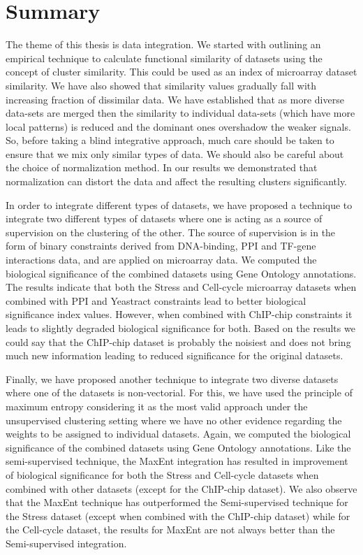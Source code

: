 \section{Summary}
The theme of this thesis is data integration. We started with outlining an empirical technique to calculate functional similarity of datasets using the concept of cluster similarity. This could be used as an index of microarray dataset similarity. We have also showed that similarity values gradually fall with increasing fraction of dissimilar data. We have established that as more diverse data-sets are merged then the similarity to individual data-sets (which have more local patterns) is reduced and the dominant ones overshadow the weaker signals. So, before taking a blind integrative approach, much care should be taken to ensure that we mix only similar types of data. We should also be careful about the choice of normalization method. In our results we demonstrated that normalization can distort the data and affect the resulting clusters significantly.

In order to integrate different types of datasets, we have proposed a technique to integrate two different types of  datasets where one is acting as a source of supervision on the clustering of the other. The source of supervision is in the form of binary constraints derived from DNA-binding, PPI and TF-gene interactions data, and are applied on microarray data. We computed the biological significance of the combined datasets using Gene Ontology annotations. The results indicate that both the Stress and Cell-cycle microarray datasets when combined with PPI and Yeastract constraints lead to better biological significance index values. However, when combined with ChIP-chip constraints it leads to slightly degraded biological significance for both. Based on the results we could say that the ChIP-chip dataset is probably the noisiest and does not bring much new information leading to reduced significance for the original datasets. 

Finally, we have proposed another technique to integrate two diverse datasets where one of the datasets is non-vectorial. For this, we have used the principle of maximum entropy considering it as the most valid approach under the unsupervised clustering setting where we have no other evidence regarding the weights to be assigned to individual datasets. Again, we computed the biological significance of the combined datasets using Gene Ontology annotations. Like the semi-supervised technique, the MaxEnt integration has resulted in improvement of biological significance for both the Stress and Cell-cycle datasets when combined with other datasets (except for the ChIP-chip dataset). We also observe that the MaxEnt technique has outperformed the Semi-supervised technique for the Stress dataset (except when combined with the ChIP-chip dataset) while for the Cell-cycle dataset, the results for MaxEnt are not always better than the Semi-supervised integration. 

